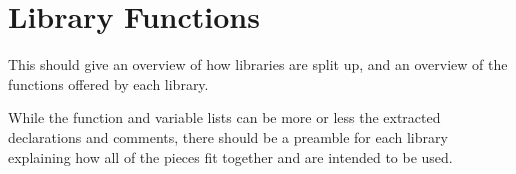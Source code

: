 
\chapter{Library Functions}
\label{funcs}


This should give an overview of how libraries are split up, and an overview 
of the functions offered by each library.

While the function and variable lists can be more or less the extracted 
declarations and comments, there should be a preamble for each library 
explaining how all of the pieces fit together and are intended to be used.

%

